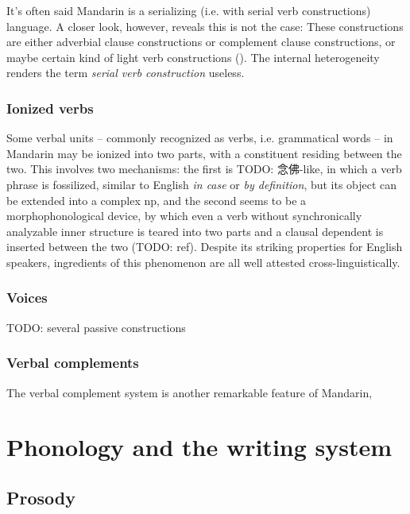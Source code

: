 \documentclass[UTF8, a4paper, oneside, scheme=plain]{ctexrep}
\newcommand*{\term}[1]{\emph{#1}}
\newcommand{\corpus}[1]{\emph{#1}}
\begin{document}
It's often said Mandarin is a serializing (i.e. with serial verb constructions) language.
A closer look, however, reveals this is not the case:
These constructions are either adverbial clause constructions 
or complement clause constructions, 
or maybe certain kind of light verb constructions ().
The internal heterogeneity renders the term \term{serial verb construction} useless.

\subsection{Ionized verbs}

Some verbal units -- commonly recognized as verbs, i.e. grammatical words -- in Mandarin
may be ionized into two parts, 
with a constituent residing between the two. 
This involves two mechanisms:
the first is TODO: 念佛-like, in which a verb phrase is fossilized, 
similar to English \corpus{in case} or \corpus{by definition},  
but its object can be extended into a complex \acs{np},
and the second seems to be a morphophonological device, 
by which even a verb without synchronically analyzable inner structure 
is teared into two parts and a clausal dependent is inserted between the two (TODO: ref).
Despite its striking properties for English speakers, 
ingredients of this phenomenon are all well attested cross-linguistically.

\subsection{Voices}

TODO: several passive constructions

\subsection{Verbal complements}

The verbal complement system is another remarkable feature of Mandarin, 


\chapter{Phonology and the writing system}

\section{Prosody}\label{sec:prosody-structure}
\end{document}
